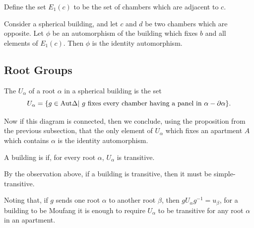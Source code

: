 \documentclass[11pt]{article}
\begin{document}
\begin{definition}
    Define the set $E_1(c)$ to be the set of chambers which are adjacent to $c$.
\end{definition}

\begin{proposition}
    Consider a spherical building, and let $c$ and $d$ be two chambers which are opposite. Let $\phi$ be an automorphism of the building which fixes $b$ and all elements of $E_1(c)$. Then $\phi$ is the identity automorphism.  
\end{proposition}

\subsection{Root Groups}

\begin{definition}
    The  $U_\alpha$ of a root $\alpha$ in a spherical building is the set
    \[U_\alpha = \{ g\in \textnormal{Aut}\Delta |\textnormal{ } g \textnormal{ fixes every chamber having a panel in } \alpha-\partial\alpha\}. \]
\end{definition}


Now if this diagram is connected, then we conclude, using the proposition from the previous subsection, that the only element of $U_\alpha$ which fixes an apartment $A$ which contains $\alpha$ is the identity automorphism. 


\begin{definition}
    A building is  if, for every root $\alpha$, $U_\alpha$ is transitive.
\end{definition}

By the observation above, if a building is transitive, then it must be simple-transitive. 

Noting that, if $g$ sends one root $\alpha$ to another root $\beta$, then $gU_\alpha g^{-1}= u_\beta$, for a building to be Moufang it is enough to require $U_\alpha$ to be transitive for any root $\alpha$ in an apartment. 
\end{document}
